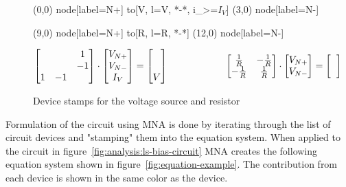 \begin{figure}[h]
		\centering
		\begin{circuitdev}
			(0,0) node[label=N+]{} to[V, l=V, *-*, i_>=$I_V$] (3,0) node[label=N-]{}
			
			
			(9,0) node[label=N+]{} to[R, l=R, *-*] (12,0) node[label=N-]{}
		\end{circuitdev}
\[\begin{bmatrix}
	 &  & 1  \\
	 &  & -1 \\
	1 & -1 & 
\end{bmatrix} \cdot 
\begin{bmatrix}
V_{N+}\\
V_{N-}\\
I_V
\end{bmatrix}
=
\begin{bmatrix}
 \\
 \\
 V
\end{bmatrix}
\qquad
\qquad
\qquad
\begin{bmatrix}
	\frac{1}{R}& -\frac{1}{R}  \\
-\frac{1}{R}	& \frac{1}{R} \\
	\end{bmatrix}
\cdot
\begin{bmatrix}
V_{N+}\\
V_{N-}\\
\end{bmatrix}
=
\begin{bmatrix}
	\\
	\color{white}{f}
\end{bmatrix}\]
	\caption{Device stamps for the voltage source and resistor}
	\label{fig:device-stamps}
\end{figure}

Formulation of the circuit using MNA is done by iterating through the list of circuit devices and "stamping" them into the equation system. When applied to the circuit in figure~\ref{fig:analysis:ls-bias-circuit} MNA creates the following equation system shown in figure~\ref{fig:equation-example}. The contribution from each device is shown in the same color as the device.

